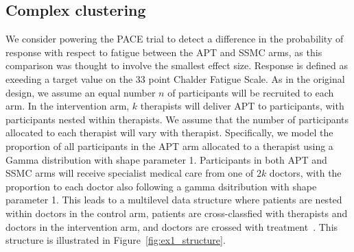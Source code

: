 \documentclass{article} %
\begin{document}
\subsection{Complex clustering}\label{sec:ex1}

We consider powering the PACE trial to detect a difference in the probability of response with respect to fatigue between the APT and SSMC arms, as this comparison was thought to involve the smallest effect size. Response is defined as exeeding a target value on the 33 point Chalder Fatigue Scale. As in the original design, we assume an equal number $n$ of participants will be recruited to each arm. In the intervention arm, $k$ therapists will deliver APT to participants, with participants nested within therapists. We assume that the number of participants allocated to each therapist will vary with therapist. Specifically, we model the proportion of all participants in the APT arm allocated to a therapist using a Gamma distribution with shape parameter 1. Participants in both APT and SSMC arms will receive specialist medical care from one of $2k$ doctors, with the proportion to each doctor also following a gamma dsitribution with shape parameter 1. This leads to a multilevel data structure where patients are nested within doctors in the control arm, patients are cross-classfied with therapists and doctors in the intervention arm, and doctors are crossed with treatment~\cite{Walwyn2010}. This structure is illustrated in Figure~\ref{fig:ex1_structure}.
\end{document}
